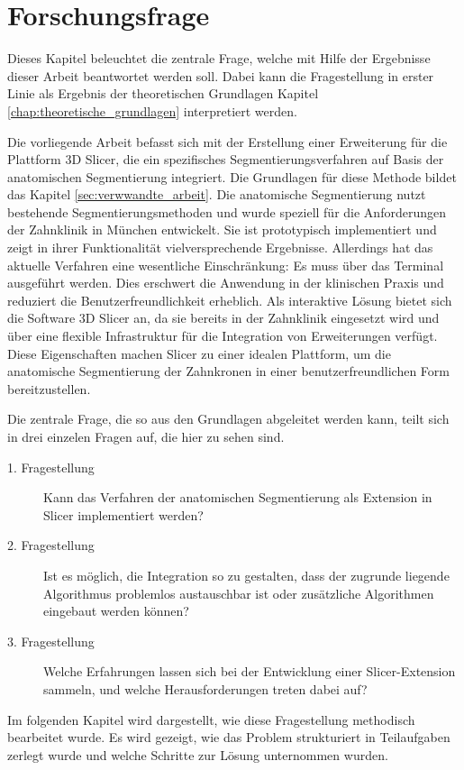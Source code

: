 \chapter{Forschungsfrage}
\label{chap:fragestellung} Dieses Kapitel beleuchtet die zentrale Frage, welche
mit Hilfe der Ergebnisse dieser Arbeit beantwortet werden soll. Dabei kann die Fragestellung
in erster Linie als Ergebnis der theoretischen Grundlagen Kapitel \ref{chap:theoretische_grundlagen}
interpretiert werden.

Die vorliegende Arbeit befasst sich mit der Erstellung einer Erweiterung für die
Plattform 3D Slicer, die ein spezifisches Segmentierungsverfahren auf Basis der
anatomischen Segmentierung integriert. Die Grundlagen für diese Methode bildet das
Kapitel \ref{sec:verwwandte_arbeit}. Die anatomische Segmentierung nutzt
bestehende Segmentierungsmethoden und wurde speziell für die Anforderungen der
Zahnklinik in München entwickelt. Sie ist prototypisch implementiert und zeigt in
ihrer Funktionalität vielversprechende Ergebnisse. Allerdings hat das aktuelle
Verfahren eine wesentliche Einschränkung: Es muss über das Terminal ausgeführt werden.
Dies erschwert die Anwendung in der klinischen Praxis und reduziert die
Benutzerfreundlichkeit erheblich. Als interaktive Lösung bietet sich die Software
3D Slicer an, da sie bereits in der Zahnklinik eingesetzt wird und über eine
flexible Infrastruktur für die Integration von Erweiterungen verfügt. Diese Eigenschaften
machen Slicer zu einer idealen Plattform, um die anatomische Segmentierung der
Zahnkronen in einer benutzerfreundlichen Form bereitzustellen.

Die zentrale Frage, die so aus den Grundlagen abgeleitet werden kann, teilt sich
in drei einzelen Fragen auf, die hier zu sehen sind.

\begin{description}
	\item[1. Fragestellung] Kann das Verfahren der anatomischen Segmentierung als Extension
		in Slicer implementiert werden?

	\item[2. Fragestellung] Ist es möglich, die Integration so zu gestalten, dass der
		zugrunde liegende Algorithmus problemlos austauschbar ist oder zusätzliche Algorithmen
		eingebaut werden können?

	\item[3. Fragestellung] Welche Erfahrungen lassen sich bei der Entwicklung einer
		Slicer-Extension sammeln, und welche Herausforderungen treten dabei auf?
\end{description}

Im folgenden Kapitel wird dargestellt, wie diese Fragestellung methodisch bearbeitet
wurde. Es wird gezeigt, wie das Problem strukturiert in Teilaufgaben zerlegt wurde
und welche Schritte zur Lösung unternommen wurden.

